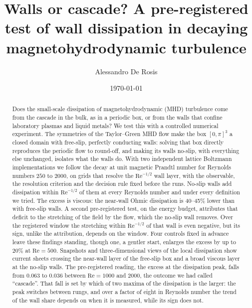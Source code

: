 \documentclass[aip,pop,reprint,amsmath,amssymb,superscriptaddress,floatfix]{revtex4-2}
\newcommand{\Rey}{\mathrm{Re}}
\begin{document}
\title{Walls or cascade? A pre-registered test of wall dissipation in decaying
magnetohydrodynamic turbulence}

\author{Alessandro De Rosis}

\date{\today}

\begin{abstract}
Does the small-scale dissipation of magnetohydrodynamic (MHD) turbulence come from
the cascade in the bulk, as in a periodic box, or from the walls that confine
laboratory plasmas and liquid metals? We test this with a controlled numerical
experiment. The symmetries of the Taylor--Green MHD flow make the box $[0,\pi]^3$ a
closed domain with free-slip, perfectly conducting walls: solving that box directly
reproduces the periodic flow to round-off, and making its walls no-slip, with
everything else unchanged, isolates what the walls do. With two independent lattice
Boltzmann implementations we follow the decay at unit magnetic Prandtl number for
Reynolds numbers $250$ to $2000$, on grids that resolve the $\Rey^{-1/2}$ wall layer,
with the observable, the resolution criterion and the decision rule fixed before the
runs. No-slip walls add dissipation within $\Rey^{-1/2}$ of them at every Reynolds
number and under every definition we tried. The excess is viscous: the near-wall
Ohmic dissipation is 40--45\% lower than with free-slip walls. A second
pre-registered test, on the energy budget, attributes that deficit to the stretching
of the field by the flow, which the no-slip wall removes. Over the registered window
the stretching within $\Rey^{-1/2}$ of that wall is even negative, but its sign,
unlike the attribution, depends on the window. Four controls fixed in advance leave these findings standing, though
one, a gentler start, enlarges the excess by up to 20\% at $\Rey=500$. Snapshots and
three-dimensional views of the local dissipation show current sheets crossing the
near-wall layer of the free-slip box and a broad viscous layer at the no-slip walls. The pre-registered
reading, the excess at the dissipation peak, falls from $0.063$ to $0.036$ between
$\Rey=1000$ and $2000$, the outcome we had called ``cascade''. That fall is set by
which of two maxima of the dissipation is the larger: the peak switches between
rungs, and over a factor of eight in Reynolds number the trend of the wall share
depends on when it is measured, while its sign does not.
\end{abstract}
\end{document}
